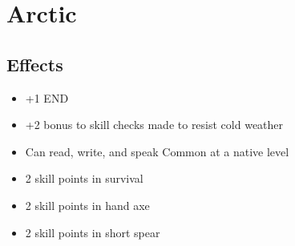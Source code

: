 \section{Arctic}\label{culture:arctic}

\subsection*{Effects}
\begin{itemize}
    \item +1 END
    \item +2 bonus to skill checks made to resist cold weather
    \item Can read, write, and speak Common at a native level
    \item 2 skill points in survival
    \item 2 skill points in hand axe
    \item 2 skill points in short spear
\end{itemize}
